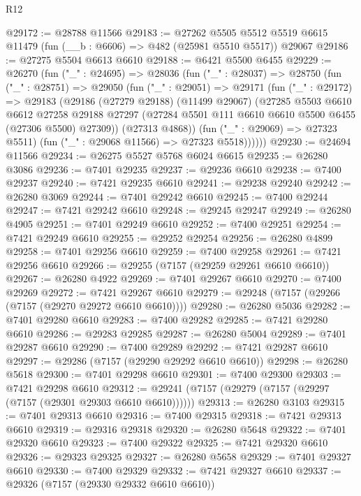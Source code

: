 \begin{lexlean}{R12}
\begin{coremodule}
@29172 := @28788 @11566
@29183 := @27262
    @5505
    @5512
    @5519
    @6615
    @11479
    (fun (__b : @6606) => @482 (@25981 @5510 @5517))
    @29067
@29186 := @27275 @5504 @6613 @6610
@29188 := @6421 @5500 @6455
@29229 := @26270
    (fun ("_" : @24695) =>
    @28036
      (fun ("_" : @28037) =>
      @28750
        (fun ("_" : @28751) =>
        @29050
          (fun ("_" : @29051) =>
          @29171
            (fun ("_" : @29172) =>
            @29183
              (@29186
                (@27279 @29188)
                (@11499 @29067)
                (@27285
                  @5503
                  @6610
                  @6612
                  @27258
                  @29188
                  @27297
                  (@27284 @5501 @111 @6610 @6610 @5500 @6455 (@27306 @5500) @27309))
                (@27313 @4868))
              (fun ("_" : @29069) => @27323 @5511)
              (fun ("_" : @29068 @11566) => @27323 @5518))))))
@29230 := @24694 @11566
@29234 := @26275 @5527 @5768 @6024 @6615
@29235 := @26280 @3086
@29236 := @7401 @29235
@29237 := @29236 @6610
@29238 := @7400 @29237
@29240 := @7421 @29235 @6610
@29241 := @29238 @29240
@29242 := @26280 @3069
@29244 := @7401 @29242 @6610
@29245 := @7400 @29244
@29247 := @7421 @29242 @6610
@29248 := @29245 @29247
@29249 := @26280 @4905
@29251 := @7401 @29249 @6610
@29252 := @7400 @29251
@29254 := @7421 @29249 @6610
@29255 := @29252 @29254
@29256 := @26280 @4899
@29258 := @7401 @29256 @6610
@29259 := @7400 @29258
@29261 := @7421 @29256 @6610
@29266 := @29255 (@7157 (@29259 @29261 @6610 @6610))
@29267 := @26280 @4922
@29269 := @7401 @29267 @6610
@29270 := @7400 @29269
@29272 := @7421 @29267 @6610
@29279 := @29248 (@7157 (@29266 (@7157 (@29270 @29272 @6610 @6610))))
@29280 := @26280 @5036
@29282 := @7401 @29280 @6610
@29283 := @7400 @29282
@29285 := @7421 @29280 @6610
@29286 := @29283 @29285
@29287 := @26280 @5004
@29289 := @7401 @29287 @6610
@29290 := @7400 @29289
@29292 := @7421 @29287 @6610
@29297 := @29286 (@7157 (@29290 @29292 @6610 @6610))
@29298 := @26280 @5618
@29300 := @7401 @29298 @6610
@29301 := @7400 @29300
@29303 := @7421 @29298 @6610
@29312 := @29241 (@7157 (@29279 (@7157 (@29297 (@7157 (@29301 @29303 @6610 @6610))))))
@29313 := @26280 @3103
@29315 := @7401 @29313 @6610
@29316 := @7400 @29315
@29318 := @7421 @29313 @6610
@29319 := @29316 @29318
@29320 := @26280 @5648
@29322 := @7401 @29320 @6610
@29323 := @7400 @29322
@29325 := @7421 @29320 @6610
@29326 := @29323 @29325
@29327 := @26280 @5658
@29329 := @7401 @29327 @6610
@29330 := @7400 @29329
@29332 := @7421 @29327 @6610
@29337 := @29326 (@7157 (@29330 @29332 @6610 @6610))

\end{coremodule}
\end{lexlean}
